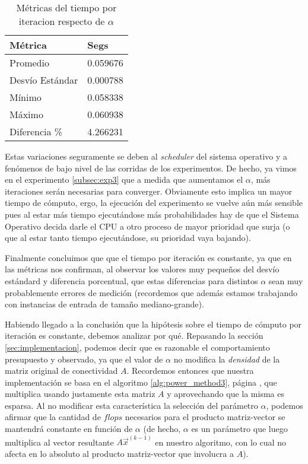 \begin{table}[H]
    \centering
    \caption{Métricas del tiempo por iteracion respecto de $\alpha$}
    \label{tbl:exp4_data_notredame} 
    \setlength{\tabcolsep}{3pt}
    \begin{tabular}{|l|l|}
        \hline
        Métrica & Segs\\
        \hline\hline
        Promedio & 0.059676\\
        Desv\'io Est\'andar & 0.000788\\
        M\'inimo & 0.058338\\
        M\'aximo & 0.060938\\
        Diferencia \%\footnotemark& 4.266231\\
        \hline
    \end{tabular}
\end{table}


\par Estas variaciones seguramente se deben al \emph{scheduler} del sistema
operativo y a fenómenos de bajo nivel de las corridas de los
experimentos. De hecho, ya vimos en el experimento \ref{subsec:exp3} que a
medida que aumentamos el $\alpha$, m\'as iteraciones ser\'an necesarias para
converger. Obviamente esto implica un mayor tiempo de c\'omputo, ergo, la
ejecuci\'on del experimento se vuelve a\'un m\'as sensible pues al estar m\'as
tiempo ejecut\'andose m\'as probabilidades hay de que el Sistema Operativo
decida darle el CPU a otro proceso de mayor prioridad que surja (o que al estar
tanto tiempo ejecut\'andose, su prioridad vaya bajando).

\par Finalmente concluimos que que el tiempo por iteraci\'on es constante, ya
que en las m\'etricas nos confirman, al observar los valores muy peque\~nos del
desv\'io est\'andard y diferencia porcentual, que estas diferencias para
distintos $\alpha$ sean muy probablemente errores de medici\'on (recordemos que
adem\'as estamos trabajando con instancias de entrada de tama\~no
mediano-grande).

\par Habiendo llegado a la conclusi\'on que la hip\'otesis sobre el tiempo de
c\'omputo por iteraci\'on es constante, debemos analizar por qu\'e. Repasando la
secci\'on \ref{sec:implementacion}, podemos decir que es razonable el
comportamiento presupuesto y observado, ya que el valor de $\alpha$ no modifica
la \emph{densidad} de la matriz original de conectividad $A$. Recordemos
entonces que nuestra implementaci\'on se basa en el algoritmo
\ref{alg:power_method3}, p\'agina \pageref{alg:power_method3}, que multiplica
usando justamente esta matriz $A$ y aprovechando que la misma es esparsa. Al no
modificar esta caracter\'istica la selecci\'on del par\'ametro $\alpha$, podemos
afirmar que la cantidad de $flops$ necesarios para el producto matriz-vector se
mantendr\'a constante en funci\'on de $\alpha$ (de hecho, $\alpha$ es un
par\'ametro que luego multiplica al vector resultante $A\vec{x}^{(k-1)}$ en
nuestro algoritmo, con lo cual no afecta en lo absoluto al producto
matriz-vector que involucra a $A$).

